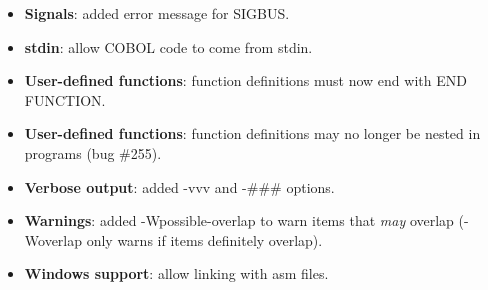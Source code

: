 \begin{itemize}
\item \textbf{Signals}: added error message for SIGBUS.
\item \textbf{stdin}: allow COBOL code to come from stdin.
\item \textbf{User-defined functions}: function definitions must now end with END FUNCTION.
\item \textbf{User-defined functions}: function definitions may no longer be nested in programs (bug \#255).
\item \textbf{Verbose output}: added -vvv and -\#\#\# options.
\item \textbf{Warnings}: added -Wpossible-overlap to warn items that \emph{may} overlap (-Woverlap only warns if items definitely overlap).
\item \textbf{Windows support}: allow linking with asm files.
\end{itemize}

